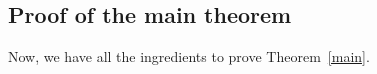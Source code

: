 \subsection{Proof of the main theorem}

 Now, we have all the ingredients to prove
Theorem~\ref{main}.

